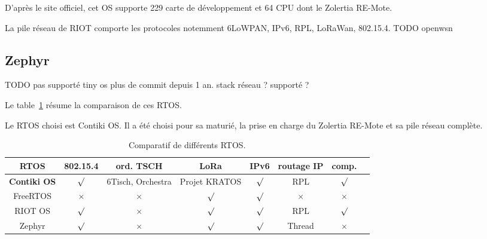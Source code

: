     D'après le site officiel, cet OS supporte 229 carte de développement et 64 CPU dont le Zolertia RE-Mote. 

    La pile réseau de RIOT comporte les protocoles notemment 6LoWPAN, IPv6, RPL, LoRaWan, 802.15.4.
    TODO openwsn

\subsection*{Zephyr}
    TODO pas supporté 
    tiny os plus de commit depuis 1 an. stack réseau ? supporté ?

Le table~\ref{tb:state-rtos-choice} résume la comparaison de ces RTOS.

Le RTOS choisi est Contiki OS. Il a été choisi pour sa maturié, la prise en charge du Zolertia RE-Mote et sa pile réseau complète.


\begin{table}[H]
    \begin{adjustbox}{width=\textwidth}
        \begin{tabular}{c||c|c|c|c|c|c|c}
            RTOS & 802.15.4 & ord. TSCH & LoRa & IPv6 & routage IP & comp. \\ \hline

            \textbf{Contiki OS} & $\surd$  & 6Tisch, Orchestra & Projet KRATOS & $\surd$ & RPL        & $\surd$ \\ \hline

            FreeRTOS            & $\times$ & $\times$          & $\surd$       & $\surd$ & $\times$   &    $\times$     \\ \hline

            RIOT OS             & $\surd$  & $\times$          & $\surd$       & $\surd$ & RPL        &    $\surd$     \\ \hline

            Zephyr              & $\surd$  & $\times$          & $\surd$       & $\surd$ & Thread     &    $\times$     \\
        \end{tabular}
    \end{adjustbox}
    \caption{Comparatif de différents RTOS.}
    \label{tb:state-rtos-choice}
\end{table}